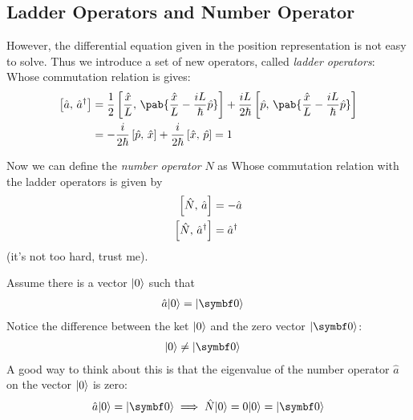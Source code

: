 \subsection{Ladder Operators and Number Operator}
However, the differential equation given in the position representation is not easy to solve.
Thus we introduce a set of new operators, called \emph{ladder operators}:
Whose commutation relation is gives:
\begin{align}
  \commt{\hat{a}}{\hat{a}^{\dagger}}
   & = \frac{1}{2} \commt{\frac{\hat{x}}{L}}{\pab{\frac{\hat{x}}{L} - \frac{iL}{\hbar}\hat{p}}}
  + \frac{iL}{2 \hbar} \commt{\hat{p}}{\pab{\frac{\hat{x}}{L} - \frac{iL}{\hbar}\hat{p}}}            \\
   & = - \frac{i}{2 \hbar} \commt{\hat{p}}{\hat{x}} + \frac{i}{2 \hbar} \commt{\hat{x}}{\hat{p}} = 1
\end{align}

Now we can define the \emph{number operator} $\hat{N}$ as
Whose commutation relation with the ladder operators is given by
\begin{align}
  \left\lbrack \hat{N} ,\, \hat{a} \right\rbrack           & = - \hat{a}         \\
  \left\lbrack \hat{N} ,\, \hat{a}^{\dagger} \right\rbrack & = \hat{a}^{\dagger}
\end{align}
(it's not too hard, trust me).

Assume there is a vector $\lvert0\rangle$ such that
\begin{align}
  \hat{a} \ket{0} & = \zeroket
\end{align}
Notice the difference between the ket $\lvert0\rangle$ and the zero vector $\zeroket$:
\begin{align}
  \ket{0} & \neq \zeroket
\end{align}
A good way to think about this is that the eigenvalue of the number operator $\hat{a}$ on the vector $\lvert0\rangle$ is zero:
\begin{align}
  \hat{a} \ket{0} = \zeroket \implies \hat{N} \ket{0} = 0 \ket{0} = \zeroket
\end{align}

